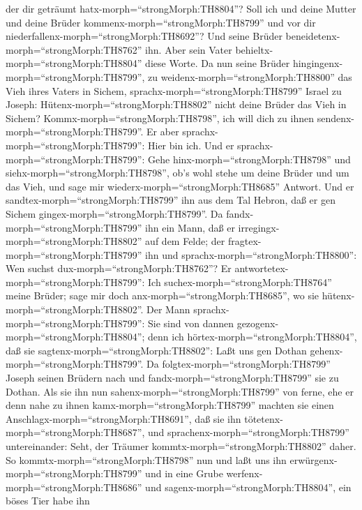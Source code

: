 der dir geträumt hatx-morph=``strongMorph:TH8804''? Soll ich und deine
Mutter und deine Brüder kommenx-morph=``strongMorph:TH8799'' und vor dir
niederfallenx-morph=``strongMorph:TH8692''?  Und seine
Brüder beneidetenx-morph=``strongMorph:TH8762'' ihn. Aber sein Vater
behieltx-morph=``strongMorph:TH8804'' diese Worte.  Da nun
seine Brüder hingingenx-morph=``strongMorph:TH8799'', zu
weidenx-morph=``strongMorph:TH8800'' das Vieh ihres Vaters in Sichem,
 sprachx-morph=``strongMorph:TH8799'' Israel zu Joseph:
Hütenx-morph=``strongMorph:TH8802'' nicht deine Brüder das Vieh in
Sichem? Kommx-morph=``strongMorph:TH8798'', ich will dich zu ihnen
sendenx-morph=``strongMorph:TH8799''. Er aber
sprachx-morph=``strongMorph:TH8799'': Hier bin ich.  Und er
sprachx-morph=``strongMorph:TH8799'': Gehe
hinx-morph=``strongMorph:TH8798'' und
siehx-morph=``strongMorph:TH8798'', ob's wohl stehe um deine Brüder und
um das Vieh, und sage mir wiederx-morph=``strongMorph:TH8685'' Antwort.
Und er sandtex-morph=``strongMorph:TH8799'' ihn aus dem Tal Hebron, daß
er gen Sichem gingex-morph=``strongMorph:TH8799''.  Da
fandx-morph=``strongMorph:TH8799'' ihn ein Mann, daß er
irregingx-morph=``strongMorph:TH8802'' auf dem Felde; der
fragtex-morph=``strongMorph:TH8799'' ihn und
sprachx-morph=``strongMorph:TH8800'': Wen suchst
dux-morph=``strongMorph:TH8762''?  Er
antwortetex-morph=``strongMorph:TH8799'': Ich
suchex-morph=``strongMorph:TH8764'' meine Brüder; sage mir doch
anx-morph=``strongMorph:TH8685'', wo sie
hütenx-morph=``strongMorph:TH8802''.  Der Mann
sprachx-morph=``strongMorph:TH8799'': Sie sind von dannen
gezogenx-morph=``strongMorph:TH8804''; denn ich
hörtex-morph=``strongMorph:TH8804'', daß sie
sagtenx-morph=``strongMorph:TH8802'': Laßt uns gen Dothan
gehenx-morph=``strongMorph:TH8799''. Da
folgtex-morph=``strongMorph:TH8799'' Joseph seinen Brüdern nach und
fandx-morph=``strongMorph:TH8799'' sie zu Dothan.  Als sie
ihn nun sahenx-morph=``strongMorph:TH8799'' von ferne, ehe er denn nahe
zu ihnen kamx-morph=``strongMorph:TH8799'' machten sie einen
Anschlagx-morph=``strongMorph:TH8691'', daß sie ihn
tötetenx-morph=``strongMorph:TH8687'',  und
sprachenx-morph=``strongMorph:TH8799'' untereinander: Seht, der Träumer
kommtx-morph=``strongMorph:TH8802'' daher.  So
kommtx-morph=``strongMorph:TH8798'' nun und laßt uns ihn
erwürgenx-morph=``strongMorph:TH8799'' und in eine Grube
werfenx-morph=``strongMorph:TH8686'' und
sagenx-morph=``strongMorph:TH8804'', ein böses Tier habe ihn
